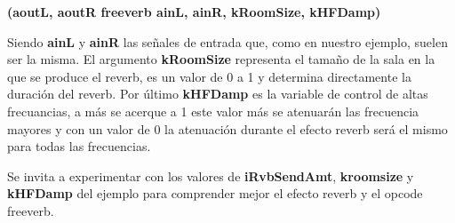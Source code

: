 \textbf{(aoutL, aoutR freeverb ainL, ainR, kRoomSize, kHFDamp)}

Siendo \textbf{ainL} y \textbf{ainR} las señales de entrada que, como en nuestro ejemplo, suelen ser la misma. El argumento \textbf{kRoomSize} representa el tamaño de la sala en la que se produce el reverb, es un valor de 0 a 1 y determina directamente la duración del reverb. Por último \textbf{kHFDamp} es la variable de control de altas frecuancias, a más se acerque a 1 este valor más se atenuarán las frecuencia mayores y con un valor de 0 la atenuación durante el efecto reverb será el mismo para todas las frecuencias.

Se invita a experimentar con los valores de \textbf{iRvbSendAmt}, \textbf{kroomsize} y \textbf{kHFDamp} del ejemplo para comprender mejor el efecto reverb y el opcode freeverb.